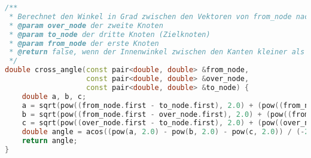 \documentclass[a4paper,10pt,ngerman]{scrartcl}
\begin{document}
    \newpage
    \begin{lstlisting}[frame=single,language=C++,title=Methode cross_angle,breaklines=true,label={lst:code_crossAngle}]
/**
 * Berechnet den Winkel in Grad zwischen den Vektoren von from_node nach over_node und over_node nach to_node
 * @param over_node der zweite Knoten
 * @param to_node der dritte Knoten (Zielknoten)
 * @param from_node der erste Knoten
 * @return false, wenn der Innenwinkel zwischen den Kanten kleiner als 90° beträgt, andernfalls true
 */
double cross_angle(const pair<double, double> &from_node,
                   const pair<double, double> &over_node,
                   const pair<double, double> &to_node) {
    double a, b, c;
    a = sqrt(pow((from_node.first - to_node.first), 2.0) + (pow((from_node.second - to_node.second), 2.0)));
    b = sqrt(pow((from_node.first - over_node.first), 2.0) + (pow((from_node.second - over_node.second), 2.0)));
    c = sqrt(pow((over_node.first - to_node.first), 2.0) + (pow((over_node.second - to_node.second), 2.0)));
    double angle = acos((pow(a, 2.0) - pow(b, 2.0) - pow(c, 2.0)) / (-2 * b * c)) * 180 / M_PI;
    return angle;
}
    \end{lstlisting}
\end{document}
